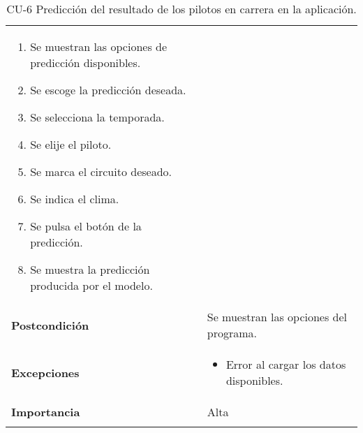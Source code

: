 \begin{longtable}[h!]{@{}ll@{}}
\begin{minipage}[t]{0.71\columnwidth}
\begin{enumerate}
\def\labelenumi{\arabic{enumi}.}
\tightlist
\item
  Se muestran las opciones de predicción disponibles.
\item
  Se escoge la predicción deseada.
\item
  Se selecciona la temporada.
\item
  Se elije el piloto.
\item
  Se marca el circuito deseado.
\item
  Se indica el clima.
\item
  Se pulsa el botón de la predicción.
\item
  Se muestra la predicción producida por el modelo.
\end{enumerate}\strut
\end{minipage}\tabularnewline
\begin{minipage}[t]{0.23\columnwidth}\raggedright\strut
\textbf{Postcondición}\strut
\end{minipage} & \begin{minipage}[t]{0.71\columnwidth}\raggedright\strut
Se muestran las opciones del programa.\strut
\end{minipage}\tabularnewline
\begin{minipage}[t]{0.23\columnwidth}\raggedright\strut
\textbf{Excepciones}\strut
\end{minipage} & \begin{minipage}[t]{0.71\columnwidth}\raggedright\strut
\begin{itemize}
\tightlist
\item
  Error al cargar los datos disponibles.
\end{itemize}\strut
\end{minipage}\tabularnewline
\begin{minipage}[t]{0.23\columnwidth}\raggedright\strut
\textbf{Importancia}\strut
\end{minipage} & \begin{minipage}[t]{0.71\columnwidth}\raggedright\strut
Alta\strut
\end{minipage}\tabularnewline
\bottomrule
\caption{CU-6 Predicción del resultado de los pilotos en carrera en la aplicación.}
\end{longtable}


